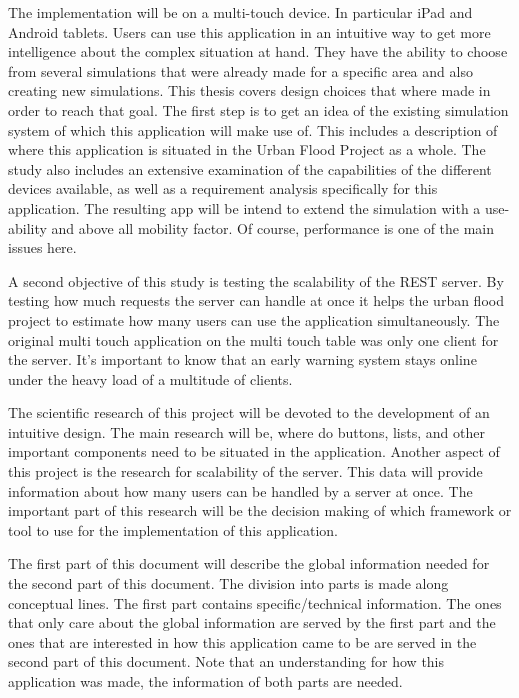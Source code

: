 The implementation will be on a multi-touch device. In particular iPad\cite{ipad} and Android\cite{android} tablets. Users can use this application in an intuitive way to get more intelligence about the complex situation at hand. They have the ability to choose from several simulations that were already made for a specific area and also creating new simulations.
This thesis covers design choices that where made in order to reach that goal. The first step is to get an idea of the existing simulation system of which this application will make use of. This includes a description of where this application is situated in the Urban Flood Project as a whole. The study also includes an extensive examination of the capabilities of the different devices available, as well as a requirement analysis specifically for this application. The resulting app will be intend to extend the simulation with a use-ability and above all mobility factor. Of course, performance is one of the main issues here. 

A second objective of this study is testing the scalability of the REST server. By testing how much requests the server can handle at once it helps the urban flood project to estimate how many users can use the application simultaneously. The original multi touch application on the multi touch table was only one client for the server. It's important to know that an early warning system stays online under the heavy load of a multitude of clients.

The scientific research of this project will be devoted to the development of an intuitive design. The main research will be, where do buttons, lists, and other important components need to be situated in the application. Another aspect of this project is the research for scalability of the server. This data will provide information about how many users can be handled by a server at once. The important part of this research will be the decision making of which framework or tool to use for the implementation of this application.

The first part of this document will describe the global information needed for the second part of this document. The division into parts is made along conceptual lines. The first part contains specific/technical information. The ones that only care about the global information are served by the first part and the ones that are interested in how this application came to be are served in the second part of this document. Note that an understanding for how this application was made, the information of both parts are needed.

